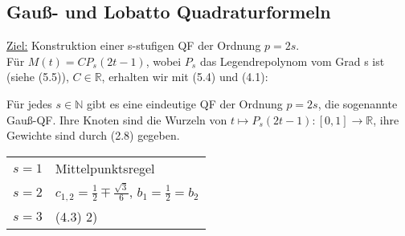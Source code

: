 \subsection{Gauß- und Lobatto Quadraturformeln}

\underline{Ziel:} Konstruktion einer s-stufigen QF der Ordnung $p=2s$.\\
Für $M(t) = CP_s(2t-1)$, wobei $P_s$ das Legendrepolynom vom Grad s ist (siehe (5.5)), $C \in \mathbb{R}$, erhalten wir mit (5.4) und (4.1):

\begin{theorem}
Für jedes $s \in \mathbb{N}$ gibt es eine eindeutige QF der Ordnung $p=2s$, die sogenannte Gauß-QF. Ihre Knoten sind die Wurzeln von $t \mapsto P_s(2t-1):[0,1] \rightarrow \mathbb{R}$, ihre Gewichte sind durch (2.8) gegeben. 
\end{theorem}
\begin{example*}
\begin{tabular}{ll}
 
$s=1$ & Mittelpunktsregel \\

$s=2$ & $c_{1,2} = \frac{1}{2} \mp \frac{\sqrt{3}}{6}$, $b_1=\frac{1}{2} = b_2$ \\

$s=3$ & (4.3) 2) \\

\end{tabular}

\end{example*}

